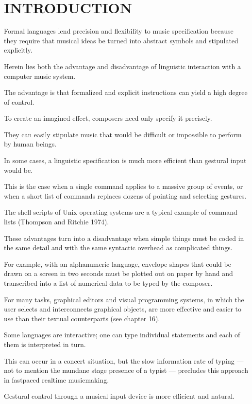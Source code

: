 \chapter{INTRODUCTION}

Formal languages lend precision and flexibility to music specification because they require that musical ideas be turned into abstract symbols and stipulated explicitly.

Herein lies both the advantage and disadvantage of linguistic interaction with a computer music system.

The advantage is that formalized and explicit instructions can yield a high degree of control.

To create an imagined effect, composers need only specify it precisely.

They can easily stipulate music that would be difficult or impossible to perform by human beings.

In some cases, a linguistic specification is much more efficient than gestural input would be.

This is the case when a single command applies to a massive group of events, or when a short list of commands replaces dozens of pointing and selecting gestures.

The shell scripts of Unix operating systems are a typical example of command lists (Thompson and Ritchie 1974).

These advantages turn into a disadvantage when simple things must be coded in the same detail and with the same syntactic overhead as complicated things.

For example, with an alphanumeric language, envelope shapes that could be drawn on a screen in two seconds must be plotted out on paper by hand and transcribed into a list of numerical data to be typed by the composer.

For many tasks, graphical editors and visual programming systems, in which the user selects and interconnects graphical objects, are more effective and easier to use than their textual counterparts (see chapter 16).

Some languages are interactive; one can type individual statements and each of them is interpreted in turn.

This can occur in a concert situation, but the slow information rate of typing — not to mention the mundane stage presence of a typist — precludes this approach in fast­paced real­time music­making.

Gestural control through a musical input device is more efficient and natural.

